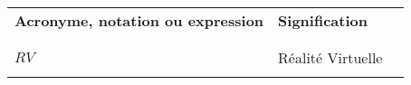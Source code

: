 

\begin{table}[htbp]
\centering
\begin{tabular}{l l l}

\textbf{Acronyme, notation ou expression} & \textbf{Signification} & \\ \\ %
\hline
\\
$RV$ & Réalité Virtuelle & \\  \\

\end{tabular}
\end{table}
